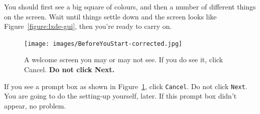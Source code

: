 \cbstart
You should first see a big square of colours, and then a number of
different things on the screen. Wait until things settle down and the
screen looks like Figure~\ref{figure:lxde-gui}, then you're ready to
carry on.
\cbend

\begin{figure}
\centerline{\texttt{[image: images/BeforeYouStart-corrected.jpg]}}
\caption{A welcome screen you may or may not see. If you do see it,
  click Cancel. {\bf Do not click Next.}}\label{BeforeYouStart}
\end{figure}
 
\cbstart
If you see a prompt box as shown in Figure~\ref{BeforeYouStart}, click
\verb+Cancel+. Do not click \verb+Next+. You are going to do the
setting-up yourself, later. If this prompt box didn't appear, no problem.
\cbend







